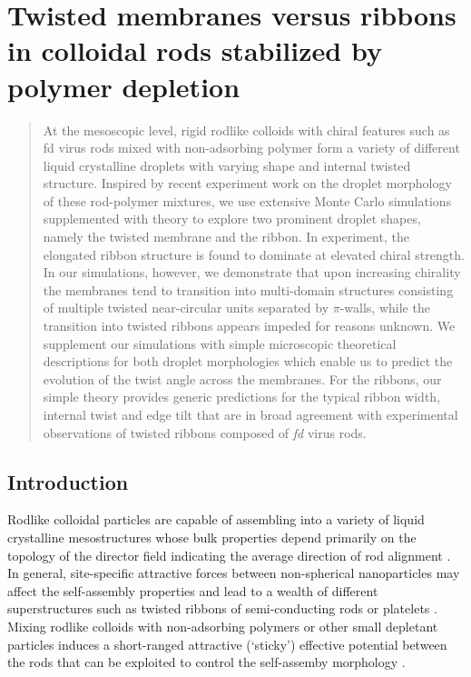 
\chapter{ Twisted membranes versus ribbons in colloidal rods stabilized by polymer depletion}
\label{twistedrods}



\begin{abstract}

At the mesoscopic level, rigid rodlike colloids with chiral features such as {\rm fd} virus rods mixed with non-adsorbing polymer form a variety of different liquid crystalline droplets with varying shape and internal twisted structure. Inspired by recent experiment work on the droplet morphology of these rod-polymer mixtures, we use extensive Monte Carlo simulations supplemented with theory to explore two prominent droplet shapes, namely the twisted membrane and the ribbon. In experiment, the elongated ribbon structure is found to dominate at elevated chiral strength. In our simulations, however, we demonstrate that upon increasing chirality the membranes tend to transition into multi-domain structures consisting of multiple twisted near-circular units separated by $\pi$-walls, while the transition into twisted ribbons appears impeded for reasons unknown. We supplement our simulations with simple microscopic theoretical descriptions for both droplet morphologies which enable us to predict the evolution of the twist angle across the membranes. For the ribbons, our simple theory provides generic predictions for the typical ribbon width, internal twist and edge tilt that are in broad agreement with experimental observations of twisted ribbons composed of  {\em fd}
virus rods. 

\end{abstract}



\section{Introduction}




Rodlike colloidal particles are capable of assembling into a variety of liquid crystalline mesostructures whose bulk properties depend primarily on the topology of the director field indicating the average direction of rod alignment \cite{dogic-fraden_fil,Ikkala2407}.
In general,  site-specific attractive forces between non-spherical nanoparticles may affect the self-assembly properties  and lead to a wealth of different superstructures \cite{Wang358} such as twisted ribbons of semi-conducting rods \cite{Srivastava1355} or platelets \cite{Janae1701483}.
Mixing rodlike colloids with non-adsorbing polymers or other small depletant particles induces a short-ranged attractive  (`sticky') effective potential between the rods that can be exploited to control the self-assemby morphology \cite{Baranov2010,Sharma2014}. 
 


